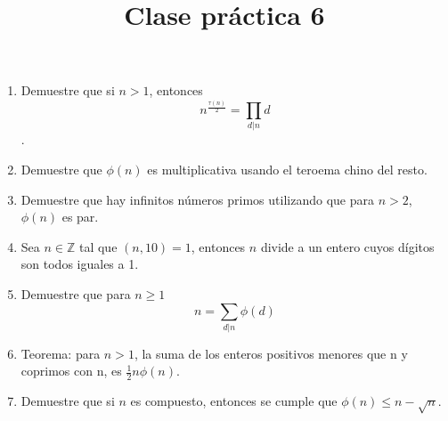 \documentclass{article}
\title{Clase pr\'actica 6}
\begin{document}
\maketitle
\begin{enumerate}
	\item Demuestre que si $n>1$, entonces $$n^{\frac{\tau(n)}{2}} = \prod_{d | n} d$$.
	\item Demuestre que $\phi(n)$ es multiplicativa usando el teroema chino del resto.
	\item Demuestre que hay infinitos n\'umeros primos utilizando que para $n>2$, $\phi(n)$ es par.
	\item Sea $n \in \mathbb{Z}$ tal que $(n, 10) = 1$, entonces $n$ divide a un entero cuyos d\'igitos son todos iguales a 1.
	\item Demuestre que para $n \geq 1$
	$$n = \sum_{d|n} \phi(d)$$
	\item Teorema: para $n>1$, la suma de los enteros positivos menores que n y coprimos con n, es $\frac{1}{2}n\phi(n)$.
	\item Demuestre que si $n$ es compuesto, entonces se cumple que $\phi(n) \leq n - \sqrt{n}$.
\end{enumerate}
\end{document}
